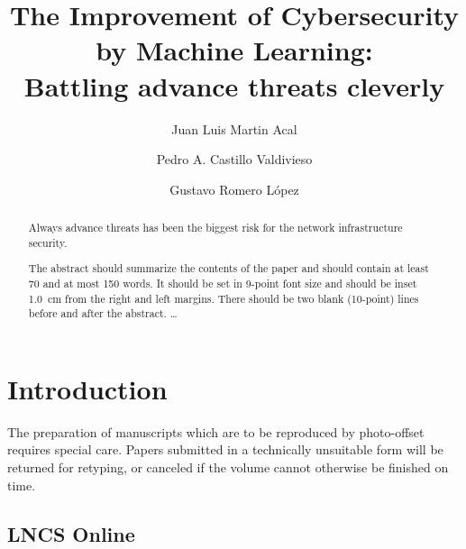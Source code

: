 \documentclass[a4paper]{llncs}
\begin{document}
\pagestyle{empty}

\mainmatter

\title{The Improvement of Cybersecurity\\by Machine Learning:\\Battling advance threats cleverly}


\author{Juan Luis Martin Acal \and Pedro A. Castillo Valdivieso
\and Gustavo Romero López}



\maketitle

\begin{abstract}
Always advance threats has been the biggest risk for the network infrastructure security. 

The abstract should summarize the contents of the paper and should
contain at least 70 and at most 150 words. It should be set in 9-point
font size and should be inset 1.0~cm from the right and left margins.
There should be two blank (10-point) lines before and after the
abstract.
\dots
\end{abstract}


\section{Introduction}

The preparation of manuscripts which are to be reproduced by
photo-offset requires special care. Papers submitted in a
technically unsuitable form will be returned for retyping, or canceled
if the volume cannot otherwise be finished on time.

\subsection{LNCS Online}
\label{sect:lncs_online}
\end{document}
